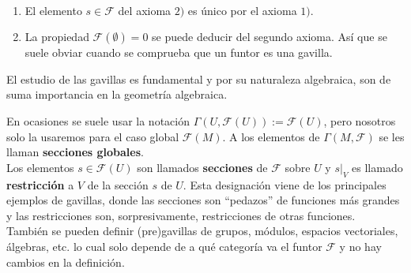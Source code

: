 \begin{remark}$ $
	\begin{enumerate}
		\item El elemento $s\in \mathscr{F}$ del axioma $2)$ es único por el axioma $1)$. 
		\item La propiedad $\mathscr{F}(\emptyset)=0$ se puede deducir del segundo axioma. Así que se suele obviar cuando se comprueba que un funtor es una gavilla.
	\end{enumerate}
\end{remark}

El estudio de las gavillas es fundamental y por su naturaleza algebraica, son de suma importancia en la geometría algebraica.
\begin{remark}
	En ocasiones se suele usar la notación $\Gamma(U,\mathscr{F}(U)):=\mathscr{F}(U)$, pero nosotros solo la usaremos para el caso global $\mathscr{F}(M)$. A los elementos de $\Gamma(M,\mathscr{F})$ se les llaman \textbf{secciones globales}.\\
	Los elementos $s\in\mathscr{F}(U)$ son llamados \textbf{secciones} de $\mathscr{F}$ sobre $U$ y $s\left.\right|_V$ es llamado \textbf{restricción} a $V$ de la sección $s$ de $U$. Esta designación viene de los principales ejemplos de gavillas, donde las secciones son \enquote{pedazos} de funciones más grandes y las restricciones son, sorpresivamente, restricciones de otras funciones.\\
	También se pueden definir (pre)gavillas de grupos, módulos, espacios vectoriales, álgebras, etc. lo cual solo depende de a qué categoría va el funtor $\mathscr{F}$ y no hay cambios en la definición.
\end{remark}

